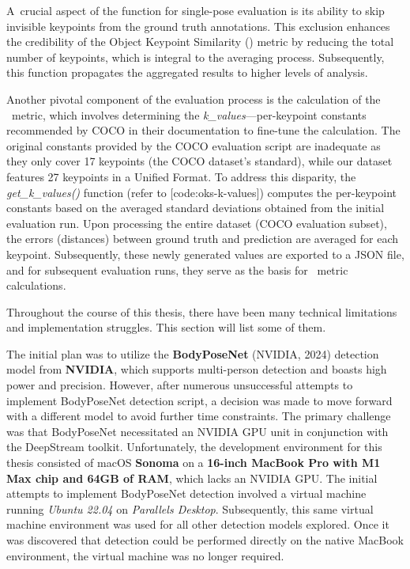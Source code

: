 
A~crucial aspect of the function for single-pose evaluation is its ability to skip invisible keypoints from the ground truth annotations. This exclusion enhances the credibility of the Object Keypoint Similarity (\OKS) metric by reducing the total number of keypoints, which is integral to the averaging process. Subsequently, this function propagates the aggregated results to higher levels of analysis.

Another pivotal component of the evaluation process is the calculation of the \OKS\ metric, which involves determining the {\it k_values}—per-keypoint constants recommended by COCO in their documentation to fine-tune the calculation. The original constants provided by the COCO evaluation script are inadequate as they only cover 17 keypoints (the COCO dataset's standard), while our dataset features 27 keypoints in a Unified Format. To address this disparity, the {\it get_k_values()} function (refer to [code:oks-k-values]) computes the per-keypoint constants based on the averaged standard deviations obtained from the initial evaluation run. Upon processing the entire dataset (COCO evaluation subset), the errors (distances) between ground truth and prediction are averaged for each keypoint. Subsequently, these newly generated values are exported to a JSON file, and for subsequent evaluation runs, they serve as the basis for \OKS\ metric calculations.


Throughout the course of this thesis, there have been many technical limitations and implementation struggles. This section will list some of them.

The initial plan was to utilize the {\bf BodyPoseNet} (NVIDIA, 2024) detection model from {\bf NVIDIA}, which supports multi-person detection and boasts high power and precision. However, after numerous unsuccessful attempts to implement BodyPoseNet detection script, a decision was made to move forward with a different model to avoid further time constraints. The primary challenge was that BodyPoseNet necessitated an NVIDIA GPU unit in conjunction with the DeepStream toolkit. Unfortunately, the development environment for this thesis consisted of macOS {\bf Sonoma} on a {\bf 16-inch MacBook Pro with M1 Max chip and 64GB of RAM}, which lacks an NVIDIA GPU. The initial attempts to implement BodyPoseNet detection involved a virtual machine running {\em Ubuntu 22.04} on {\em Parallels Desktop}. Subsequently, this same virtual machine environment was used for all other detection models explored. Once it was discovered that detection could be performed directly on the native MacBook environment, the virtual machine was no longer required.

